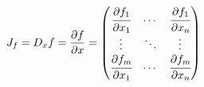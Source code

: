 $$J_f = D_x f = \frac{\partial f}{\partial x} = 
  \begin{pmatrix}
  \cfrac{\partial f_1}{\partial x_1} & \cdots & \cfrac{\partial f_1}{\partial x_n} \\
  \vdots & \ddots & \vdots \\
  \cfrac{\partial f_m}{\partial x_1} & \cdots & \cfrac{\partial f_m}{\partial x_n} 
  \end{pmatrix}
$$
